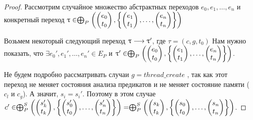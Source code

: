 \begin{proof}

Рассмотрим случайное множество абстрактных переходов $e_0, e_1, \dots, e_n$ и конкретный переход $
\uptau \in \mathrel{\bigoplus}_P
\left(
\begin{pmatrix}
e_0 \\
t_0 
\end{pmatrix},
\left\{
\begin{pmatrix}
e_1 \\
t_1 
\end{pmatrix},
\dots ,
\begin{pmatrix}
e_n \\
t_n 
\end{pmatrix}
\right\}
\right)$

Возьмем некоторый следующий переход $\uptau \longrightarrow \uptau'$, где $\tau = (c, g, t_0)$
Нам нужно показать, что 
$\exists e_0', e_1', \dots, e_n' \in E_P$ и  $
\uptau' \in \mathrel{\bigoplus}_P
\left(
\begin{pmatrix}
e_0 \\
t_0 
\end{pmatrix},
\left\{
\begin{pmatrix}
e_1 \\
t_1 
\end{pmatrix},
\dots ,
\begin{pmatrix}
e_n \\
t_n 
\end{pmatrix}
\right\}
\right)$.

Не будем подробно рассматривать случаи $g = thread\_create$
, так как этот переход не меняет состояния анализа предикатов и не меняет состояние памяти ($c_l$ и $c_g$).
А значит, $s_i = s_i'$.
Поэтому в этом случае $c' \in \mathrel{\bigoplus}^S_P
\left(
\begin{pmatrix}
s_k' \\
t_k 
\end{pmatrix},
\left\{
\begin{pmatrix}
s_0' \\
t_0 
\end{pmatrix},
\dots ,
\begin{pmatrix}
s_n' \\
t_n 
\end{pmatrix}
\right\}
\right) = 
\mathrel{\bigoplus}^S_P
\left(
\begin{pmatrix}
s_k \\
t_k 
\end{pmatrix},
\left\{
\begin{pmatrix}
s_0 \\
t_0 
\end{pmatrix},
\dots ,
\begin{pmatrix}
s_n \\
t_n 
\end{pmatrix}
\right\}
\right)$.


\end{proof}

